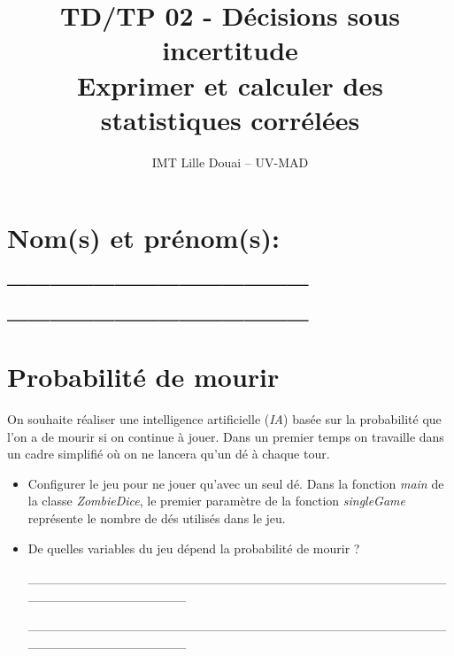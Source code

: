 \documentclass[a4paper, 10pt]{article}
\begin{document}
\author{IMT Lille Douai -- UV-MAD}
\date{}
\title{\Large{\textbf{TD/TP 02 - Décisions sous incertitude \\ Exprimer et calculer des statistiques corrélées}}}
\maketitle
\thispagestyle{fancy}

\section*{Nom(s) et prénom(s): \_\_\_\_\_\_\_\_\_\_\_\_\_\_ $\quad$ \_\_\_\_\_\_\_\_\_\_\_\_\_\_}

\bigskip

\section{Probabilité de mourir}

  On souhaite réaliser une intelligence artificielle (\emph{IA}) basée sur la probabilité que l'on a de mourir si on continue à jouer.
  Dans un premier temps on travaille dans un cadre simplifié où on ne lancera qu'un dé à chaque tour.

\begin{itemize}[$\bigcirc$]
  \item Configurer le jeu pour ne jouer qu'avec un seul dé.
  Dans la fonction \emph{main} de la classe \emph{ZombieDice}, le premier paramètre de la fonction \emph{singleGame} représente le nombre de dés utilisés dans le jeu.
  \item De quelles variables du jeu dépend la probabilité de mourir ?
  \medskip

\_\_\_\_\_\_\_\_\_\_\_\_\_\_\_\_\_\_\_\_\_\_\_\_\_\_\_\_\_\_\_\_\_\_\_\_\_\_\_\_\_\_\_\_\_\_\_\_\_\_\_\_\_\_\_\_\_\_\_\_\_\_

  \medskip

\_\_\_\_\_\_\_\_\_\_\_\_\_\_\_\_\_\_\_\_\_\_\_\_\_\_\_\_\_\_\_\_\_\_\_\_\_\_\_\_\_\_\_\_\_\_\_\_\_\_\_\_\_\_\_\_\_\_\_\_\_\_

  \medskip

\end{itemize}
\end{document}
